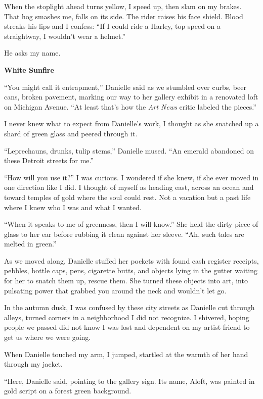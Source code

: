 \documentclass[
]{article}
\begin{document}
When the stoplight ahead turns yellow, I speed up, then slam on my
brakes. That hog smashes me, falls on its side. The rider raises his
face shield. Blood streaks his lips and I confess: ``If I could ride a
Harley, top speed on a straightway, I wouldn't wear a helmet.''

He asks my name.

\textbf{\hfill\break
}

\textbf{White Sunfire}

``You might call it entrapment,'' Danielle said as we stumbled over
curbs, beer cans, broken pavement, marking our way to her gallery
exhibit in a renovated loft on Michigan Avenue. ``At least that's how
the \emph{Art News} critic labeled the pieces.''

I never knew what to expect from Danielle's work, I thought as she
snatched up a shard of green glass and peered through it.

``Leprechauns, drunks, tulip stems,'' Danielle mused. ``An emerald
abandoned on these Detroit streets for me.''

``How will you use it?'' I was curious. I wondered if she knew, if she
ever moved in one direc­tion like I did. I thought of myself as heading
east, across an ocean and toward temples of gold where the soul could
rest. Not a vacation but a past life where I knew who I was and what I
wanted.

``When it speaks to me of greenness, then I will know.'' She held the
dirty piece of glass to her ear before rubbing it clean against her
sleeve. ``Ah, such tales are melted in green.''

As we moved along, Danielle stuffed her pockets with found cash register
receipts, pebbles, bottle caps, pens, cigarette butts, and objects lying
in the gutter waiting for her to snatch them up, rescue them. She turned
these objects into art, into pulsating power that grabbed you around the
neck and wouldn't let go.

In the autumn dusk, I was confused by these city streets as Danielle cut
through alleys, turned corners in a neighborhood I did not recognize. I
shivered, hoping people we passed did not know I was lost and dependent
on my artist friend to get us where we were going.

When Danielle touched my arm, I jumped, startled at the warmth of her
hand through my jacket.

``Here, Danielle said, pointing to the gallery sign. Its name, Aloft,
was painted in gold script on a forest green background.
\end{document}
